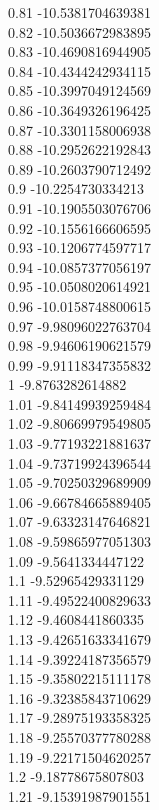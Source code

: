 {0.81	-10.5381704639381\\
0.82	-10.5036672983895\\
0.83	-10.4690816944905\\
0.84	-10.4344242934115\\
0.85	-10.3997049124569\\
0.86	-10.3649326196425\\
0.87	-10.3301158006938\\
0.88	-10.2952622192843\\
0.89	-10.2603790712492\\
0.9	-10.2254730334213\\
0.91	-10.1905503076706\\
0.92	-10.1556166606595\\
0.93	-10.1206774597717\\
0.94	-10.0857377056197\\
0.95	-10.0508020614921\\
0.96	-10.0158748800615\\
0.97	-9.98096022763704\\
0.98	-9.94606190621579\\
0.99	-9.91118347355832\\
1	-9.8763282614882\\
1.01	-9.84149939259484\\
1.02	-9.80669979549805\\
1.03	-9.77193221881637\\
1.04	-9.73719924396544\\
1.05	-9.70250329689909\\
1.06	-9.66784665889405\\
1.07	-9.63323147646821\\
1.08	-9.59865977051303\\
1.09	-9.5641334447122\\
1.1	-9.52965429331129\\
1.11	-9.49522400829633\\
1.12	-9.4608441860335\\
1.13	-9.42651633341679\\
1.14	-9.39224187356579\\
1.15	-9.35802215111178\\
1.16	-9.32385843710629\\
1.17	-9.28975193358325\\
1.18	-9.25570377780288\\
1.19	-9.22171504620257\\
1.2	-9.18778675807803\\
1.21	-9.15391987901551\\
}
